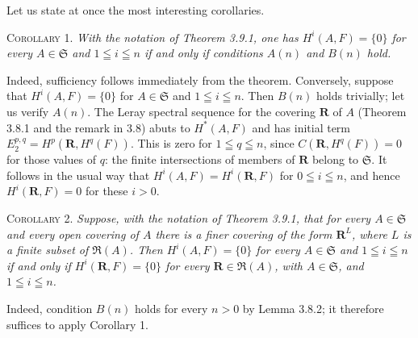 Let us state at once the most interesting corollaries.

\textsc{Corollary 1.} \textit{With the notation of Theorem \textup{3.9.1},
one has $H^i(A,F)=\{0\}$ for every $A\in\mathfrak S$ and
$1\leqq i\leqq n$ if and only if conditions $A(n)$ and $B(n)$ hold.}

Indeed, sufficiency follows immediately from the theorem.
Conversely, suppose that $H^i(A,F)=\{0\}$ for $A\in\mathfrak S$ and
$1\leqq i\leqq n$. Then $B(n)$ holds trivially; let us verify $A(n)$. The
Leray spectral sequence for the covering $\mathbf R$ of $A$ (Theorem 3.8.1
and the remark in 3.8) abuts to $H^*(A,F)$ and has initial term
$E_2^{p,q}=H^p(\mathbf R,H^q(F))$.
This is zero for $1\leqq q\leqq n$, since
$C(\mathbf R,H^q(F))=0$ for those values of $q$: the finite intersections of
members of $\mathbf R$ belong to $\mathfrak S$. It follows in the usual way
that $H^i(A,F)=H^i(\mathbf R,F)$ for $0\leqq i\leqq n$, and hence
$H^i(\mathbf R,F)=0$ for these $i>0$.

\textsc{Corollary 2.} \textit{Suppose, with the notation of Theorem
\textup{3.9.1}, that for every $A\in\mathfrak S$ and every open covering of $A$ there
is a finer covering of the form $\mathbf R^L$, where $L$ is a finite subset
of $\mathfrak R(A)$. Then $H^i(A,F)=\{0\}$ for every $A\in\mathfrak S$ and
$1\leqq i\leqq n$ if and only if $H^i(\mathbf R,F)=\{0\}$ for every
$\mathbf R\in\mathfrak R(A)$, with $A\in\mathfrak S$, and
$1\leqq i\leqq n$.}

Indeed, condition $B(n)$ holds for every $n>0$ by Lemma 3.8.2; it therefore
suffices to apply Corollary 1.


